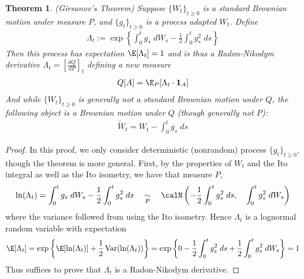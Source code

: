 \documentclass[12pt]{article}
\theoremstyle{plain}
\newtheorem{thm}{Theorem}[section]
\theoremstyle{definition}
\theoremstyle{remark}
\newcommand{\Var}{\operatorname{Var}}
\begin{document}
\begin{thm}\emph{(Girsanov's Theorem)}
Suppose $\{W_t\}_{t\geq 0}$ is a standard Brownian motion under measure
$P$, and $\{g_t\}_{t\geq 0}$ is a process adapted $W_t$.
Define
\begin{align}
  \Lambda_t
  :=
  \exp\left\{
    \int_0^t g_s\;dW_s
    - \frac{1}{2} \int_0^t g_s^2 \;ds
  \right\}
  \label{girsanov}
\end{align}
Then this process has expectation $\E[\Lambda_t]=1$ and is thus a
Radon-Nikodym derivative $\Lambda_t=\left[\frac{dQ}{dP}\right]_t$
defining a new measure
\begin{align*}
  Q[A]=\E_{P}[ \Lambda_t \cdot \mathbf{1}_A]
\end{align*}
And while $\{W_t\}_{t\geq 0}$ is generally not a standard Brownian
motion under $Q$, the following object is a Brownian motion under $Q$
(though generally not $P$):
\begin{align}
  \tilde{W}_t = W_t - \int_0^t g_s\;ds
  \label{girsanovW}
\end{align}
\end{thm}
\begin{proof}
In this proof, we only consider deterministic (nonrandom) process
$\{g_t\}_{t\geq 0}$, though the theorem is more general.
First, by the properties of $W_t$ and the Ito integral as well as the
Ito isometry, we have that measure $P$,
\begin{align*}
  \ln(\Lambda_t)
  =
  \int_0^t g_s\;dW_s
  - \frac{1}{2} \int_0^t g_s^2 \;ds
  \quad\underset{P}{\sim}\quad
  \calN\left(
  - \frac{1}{2} \int_0^t g_s^2 \;ds,
  \quad
  \int_0^t g_s^2\;dW_s
  \right)
\end{align*}
where the variance followed from using the Ito isometry.
Hence $\Lambda_t$ is a lognormal random variable with expectation
\begin{align*}
  \E[\Lambda_t]
  =
  \exp\left\{
    \E[\ln(\Lambda_t)]
    +
    \frac{1}{2}\Var(\ln(\Lambda_t))
  \right\}
  =
  \exp\left\{
    0
    - \frac{1}{2} \int_0^t g_s^2 \;ds
    +\frac{1}{2} \int_0^t g_s^2\;dW_s
  \right\}
  = 1
\end{align*}
Thus suffices to prove that $\Lambda_t$ is a Radon-Nikodym derivative.
\end{proof}
\end{document}
